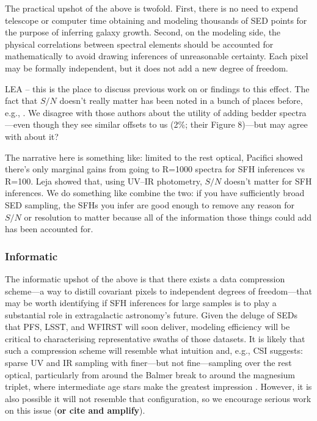 \documentclass[a4paper,fleqn,usenatbib]{mnras}
\newcommand{\bfr}{\bf\color{red}}
\newcommand{\bfb}{\color{myblue}}
\begin{document}
The practical upshot of the above is twofold. First, there is no need to expend telescope
or computer time obtaining and modeling thousands of SED points for the purpose of inferring 
galaxy growth. Second, on the modeling side, the physical correlations between spectral
elements should be accounted for mathematically to avoid drawing inferences of unreasonable 
certainty. Each pixel may be formally independent, but it does not add a new degree of freedom.
{\bfb LEA -- this is the place to discuss previous work on or findings to this effect. The fact
that $S/N$ doesn't really matter has been noted in a bunch of places before, e.g., \citet{Leja19}.
We disagree with those authors about the utility of adding bedder spectra---even though they
see similar offsets to us (2\%; their Figure 8)---but may agree with \citet{Ocvirk06} about it?

The narrative here is something like: limited to the rest optical, Pacifici showed there's only
marginal gains from going to R=1000 spectra for SFH inferences vs R=100. Leja showed that, 
using UV--IR photometry, $S/N$ doesn't matter for SFH inferences. We do something like
combine the two: if you have sufficiently broad SED sampling, the SFHs you infer are good enough
to remove any reason for $S/N$ or resolution to matter because all of the information those
things could add has been accounted for.}

\subsubsection{Informatic}

The informatic upshot of the above is that there exists a data compression scheme---a way to
distill covariant pixels to independent degrees of freedom---that may be
worth identifying if SFH inferences for large samples is to play a substantial role in extragalactic 
astronomy's future. Given the deluge of SEDs that PFS, LSST, and WFIRST will soon deliver, 
modeling efficiency will be critical to characterising representative swaths of those datasets. 
It is likely that such a compression scheme will resemble what intuition
and, e.g., CSI suggests: sparse UV and IR sampling with finer---but not fine---sampling over
the rest optical, particularly from around the Balmer break to around the magnesium triplet,
where intermediate age stars make the greatest impression \citep[e.g.,][]{Dressler16}. However,
it is also possible it will not resemble that configuration, so we encourage serious work on this 
issue ({\bfr or cite and amplify}).
\end{document}
